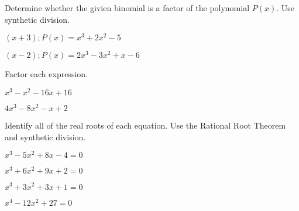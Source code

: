 \documentclass{report}
\theoremstyle{definition}
\begin{document}
\begin{enumerate}
\hspace{-2cm} Determine whether the givien binomial is a factor of the polynomial $P(x)$. Use synthetic division.\\

	\begin{minipage}[t]{0.45\linewidth}
		\item $(x+3); P(x)=x^3+2x^2-5$
	\end{minipage}
	\hfill
	\begin{minipage}[t]{0.45\linewidth}
		\item $(x-2); P(x)=2x^3-3x^2+x-6$
	\end{minipage}
	\vspace{3cm}
	
\hspace{-2cm}  Factor each expression.\\

	\begin{minipage}[t]{0.45\linewidth}
		\item  $x^3-x^2-16x+16$
	\end{minipage}
	\hfill
	\begin{minipage}[t]{0.45\linewidth}
		\item $4x^3-8x^2-x+2$
	\end{minipage}
	\vspace{3cm}
	
\hspace{-2cm}  Identify all of the real roots of each equation. Use the Rational Root Theorem and synthetic division.\\

	\begin{minipage}[t]{0.45\linewidth}
		\item $x^3-5x^2+8x-4=0$
	\end{minipage}
	\hfill
	\begin{minipage}[t]{0.45\linewidth}
		\item $x^3+6x^2+9x+2=0$
	\end{minipage}
	
	\vspace{4cm}
	
	\begin{minipage}[t]{0.45\linewidth}
		\item $x^3+3x^2+3x+1=0$
	\end{minipage}
	\hfill
	\begin{minipage}[t]{0.45\linewidth}
		\item $x^4-12x^2+27=0$
	\end{minipage}
	

\end{enumerate}
\end{document}
